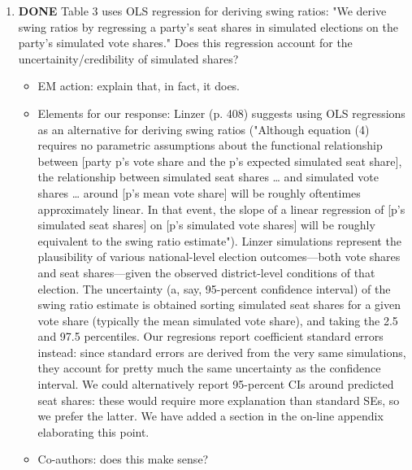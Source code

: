 \documentclass{article}
\begin{document}
\begin{enumerate}
\begin{itemize}
\end{itemize}
\item {\bfseries\sffamily DONE} Table 3 uses OLS regression for deriving swing ratios: "We derive swing ratios by regressing a party's seat shares in simulated elections on the party's simulated vote shares." Does this regression account for the uncertainity/credibility of simulated shares?
\label{sec:orgheadline30}
\begin{itemize}
\item EM action: explain that, in fact, it does.
\item Elements for our response: Linzer (p. 408) suggests using OLS regressions as an alternative for deriving swing ratios ("Although equation (4) requires no parametric assumptions about the functional relationship between [party p's vote share and the p's expected simulated seat share], the relationship between simulated seat shares \ldots{} and simulated vote shares \ldots{} around [p's mean vote share] will be roughly oftentimes approximately linear. In that event, the slope of a linear regression of [p's simulated seat shares] on [p's simulated vote shares] will be roughly equivalent to the swing ratio estimate"). Linzer simulations represent the plausibility of various national-level election outcomes---both vote shares and seat shares---given the observed district-level conditions of that election. The uncertainty (a, say, 95-percent confidence interval) of the swing ratio estimate is obtained sorting simulated seat shares for a given vote share (typically the mean simulated vote share), and taking the 2.5 and 97.5 percentiles. Our regresions report coefficient standard errors instead: since standard errors are derived from the very same simulations, they account for pretty much the same uncertainty as the confidence interval. We could alternatively report 95-percent CIs around predicted seat shares: these would require more explanation than standard SEs, so we prefer the latter. We have added a section in the on-line appendix elaborating this point.
\item Co-authors: does this make sense?
\end{itemize}
\end{enumerate}
\end{document}
